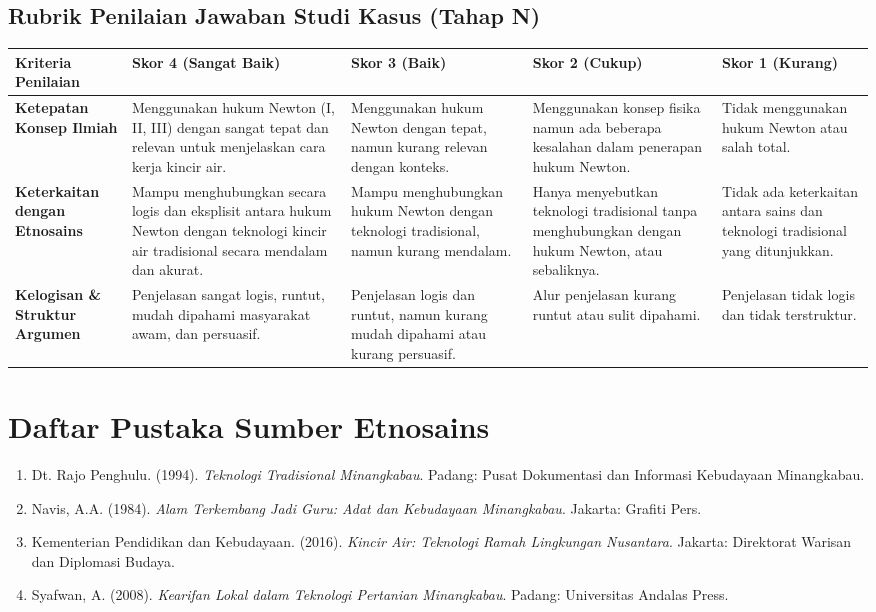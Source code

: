 \documentclass[a4paper,12pt]{article}
\begin{document}
\subsection{Rubrik Penilaian Jawaban Studi Kasus (Tahap N)}

\begin{longtable}{|p{3cm}|p{3cm}|p{3cm}|p{3cm}|p{3cm}|}
\hline
\textbf{Kriteria Penilaian} & \textbf{Skor 4 (Sangat Baik)} & \textbf{Skor 3 (Baik)} & \textbf{Skor 2 (Cukup)} & \textbf{Skor 1 (Kurang)} \\
\hline
\textbf{Ketepatan Konsep Ilmiah} & Menggunakan hukum Newton (I, II, III) dengan sangat tepat dan relevan untuk menjelaskan cara kerja kincir air. & Menggunakan hukum Newton dengan tepat, namun kurang relevan dengan konteks. & Menggunakan konsep fisika namun ada beberapa kesalahan dalam penerapan hukum Newton. & Tidak menggunakan hukum Newton atau salah total. \\
\hline
\textbf{Keterkaitan dengan Etnosains} & Mampu menghubungkan secara logis dan eksplisit antara hukum Newton dengan teknologi kincir air tradisional secara mendalam dan akurat. & Mampu menghubungkan hukum Newton dengan teknologi tradisional, namun kurang mendalam. & Hanya menyebutkan teknologi tradisional tanpa menghubungkan dengan hukum Newton, atau sebaliknya. & Tidak ada keterkaitan antara sains dan teknologi tradisional yang ditunjukkan. \\
\hline
\textbf{Kelogisan \& Struktur Argumen} & Penjelasan sangat logis, runtut, mudah dipahami masyarakat awam, dan persuasif. & Penjelasan logis dan runtut, namun kurang mudah dipahami atau kurang persuasif. & Alur penjelasan kurang runtut atau sulit dipahami. & Penjelasan tidak logis dan tidak terstruktur. \\
\hline
\end{longtable}

\section{Daftar Pustaka Sumber Etnosains}

\begin{enumerate}
\item Dt. Rajo Penghulu. (1994). \textit{Teknologi Tradisional Minangkabau}. Padang: Pusat Dokumentasi dan Informasi Kebudayaan Minangkabau.
\item Navis, A.A. (1984). \textit{Alam Terkembang Jadi Guru: Adat dan Kebudayaan Minangkabau}. Jakarta: Grafiti Pers.
\item Kementerian Pendidikan dan Kebudayaan. (2016). \textit{Kincir Air: Teknologi Ramah Lingkungan Nusantara}. Jakarta: Direktorat Warisan dan Diplomasi Budaya.
\item Syafwan, A. (2008). \textit{Kearifan Lokal dalam Teknologi Pertanian Minangkabau}. Padang: Universitas Andalas Press.
\end{enumerate}
\end{document}
